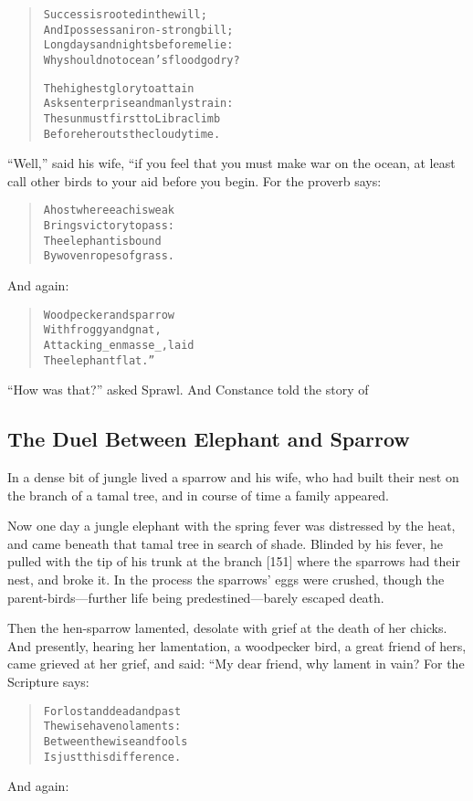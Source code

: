 \documentclass[article, twoside, 14pt]{memoir}
\renewenvironment{verbatim}{%
\begin{quote}%
\vskip -10pt%
\begin{alltt}\normalfont\large}{\end{alltt}%
\end{quote}%
\vskip -10pt
} %
\begin{document}
\begin{verbatim}
Success is rooted in the will;
And I possess an iron-strong bill;
Long days and nights before me lie:
Why should not ocean's flood go dry?

The highest glory to attain
Asks enterprise and manly strain:
The sun must first to Libra climb
Before he routs the cloudy time.
\end{verbatim}
``Well,'' said his wife, “if you feel that you must make war on the
ocean, at least call other birds to your aid before you begin. For
the proverb says:

\begin{verbatim}
A host where each is weak
    Brings victory to pass:
The elephant is bound
    By woven ropes of grass.
\end{verbatim}
And again:

\begin{verbatim}
Woodpecker and sparrow
    With froggy and gnat,
Attacking _en masse_, laid
    The elephant flat.”
\end{verbatim}
``How was that?'' asked Sprawl. And Constance told the story of

\subsection{The Duel Between Elephant and Sparrow}

\label{s21}

In a dense bit of jungle lived a sparrow and his wife, who had
built their nest on the branch of a tamal tree, and in course of
time a family appeared.

Now one day a jungle elephant with the spring fever was distressed
by the heat, and came beneath that tamal tree in search of shade.
Blinded by his fever, he pulled with the tip of his trunk at the
branch [151] where the sparrows had their nest, and broke it. In
the process the sparrows' eggs were crushed, though the
parent-birds---further life being predestined---barely escaped
death.

Then the hen-sparrow lamented, desolate with grief at the death of
her chicks. And presently, hearing her lamentation, a woodpecker
bird, a great friend of hers, came grieved at her grief, and said:
“My dear friend, why lament in vain? For the Scripture says:

\begin{verbatim}
For lost and dead and past
    The wise have no laments:
Between the wise and fools
    Is just this difference.
\end{verbatim}
And again:
\end{document}
